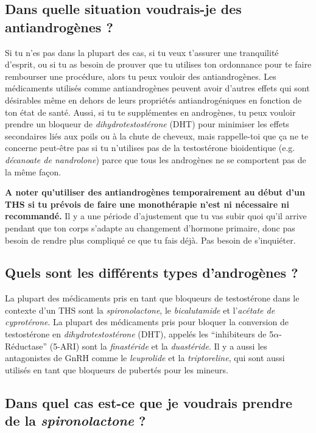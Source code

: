 \documentclass{article}
\begin{document}
\subsection{Dans quelle situation voudrais-je des antiandrogènes ?}

Si tu n'es pas dans la plupart des cas, si tu veux t'assurer une tranquilité d'esprit, ou si tu as besoin de prouver que tu utilises ton ordonnance pour te faire rembourser une procédure, alors tu peux vouloir des antiandrogènes. Les médicaments utilisés comme antiandrogènes peuvent avoir d'autres effets qui sont désirables même en dehors de leurs propriétés antiandrogéniques en fonction de ton état de santé. Aussi, si tu te supplémentes en androgènes, tu peux vouloir prendre un bloqueur de \textit{dihydrotestostérone} (DHT) pour minimiser les effets secondaires liés aux poils ou à la chute de cheveux, mais rappelle-toi que ça ne te concerne peut-être pas si tu n'utilises pas de la testostérone bioidentique (e.g. \textit{décanoate de nandrolone}) parce que tous les androgènes ne se comportent pas de la même façon.

\textbf{A noter qu'utiliser des antiandrogènes temporairement au début d'un THS si tu prévois de faire une monothérapie n'est ni nécessaire ni recommandé.} Il y a une période d'ajustement que tu vas subir quoi qu'il arrive pendant que ton corps s'adapte au changement d'hormone primaire, donc pas besoin de rendre plus compliqué ce que tu fais déjà. Pas besoin de s'inquiéter.

\subsection{Quels sont les différents types d'androgènes ?}

La plupart des médicaments pris en tant que bloqueurs de testostérone dans le contexte d'un THS sont la \textit{spironolactone}, le \textit{bicalutamide} et l'\textit{acétate de cyprotérone}. La plupart des médicaments pris pour bloquer la conversion de testostérone en \textit{dihydrotestostérone} (DHT), appelés les “inhibiteurs de 5$\alpha$-Réductase” (5-ARI) sont la \textit{finastéride} et la \textit{duastéride}. Il y a aussi les antagonistes de GnRH comme le \textit{leuprolide} et la \textit{triptoreline}, qui sont aussi utilisés en tant que bloqueurs de pubertés pour les mineurs.

\subsection{Dans quel cas est-ce que je voudrais prendre de la \textit{spironolactone} ?}
\end{document}
